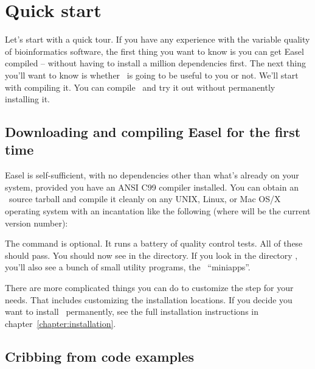 \section{Quick start}

Let's start with a quick tour. If you have any experience with the
variable quality of bioinformatics software, the first thing you want
to know is you can get Easel compiled -- without having to install a
million dependencies first. The next thing you'll want to know is
whether \Easel\ is going to be useful to you or not. We'll start with
compiling it. You can compile \Easel\ and try it out without
permanently installing it.



\subsection{Downloading and compiling Easel for the first time}

Easel is self-sufficient, with no dependencies other than what's
already on your system, provided you have an ANSI C99 compiler
installed.  You can obtain an \Easel\ source tarball and compile it
cleanly on any UNIX, Linux, or Mac OS/X operating system with an
incantation like the following (where  will be the current
version number):

\begin{cchunk}
\end{cchunk}

The  command is optional. It runs a battery of
quality control tests. All of these should pass. You should now see
 in the directory. If you look in the directory
, you'll also see a bunch of small utility programs,
the \Easel\ ``miniapps''.

There are more complicated things you can do to customize the
 step for your needs. That includes customizing the
installation locations. If you decide you want to install
\Easel\ permanently, see the full installation instructions in
chapter~\ref{chapter:installation}.



\subsection{Cribbing from code examples}

